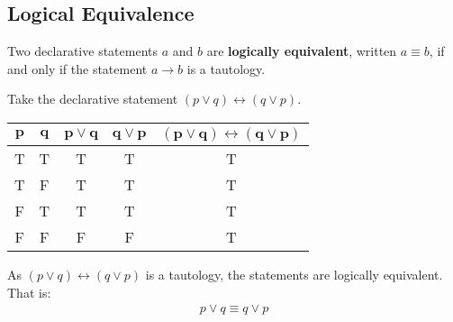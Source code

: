 \documentclass[../notes.tex]{subfiles}
\begin{document}
			\subsection{Logical Equivalence}
				Two declarative statements $a$ and $b$ are \textbf{logically equivalent}, written $a \equiv b$, if and only if the statement $a \rightarrow b$ is a tautology.
				\begin{example}
					Take the declarative statement $(p \lor q) \leftrightarrow (q \lor p)$.
					\begin{center}
						\begin{tabular}{| c c | c | c | c |}
							\hline
							$\mathbf{p}$ & $\mathbf{q}$ & $\mathbf{p \lor q}$ & $\mathbf{q \lor p}$ & $\mathbf{(p \lor q) \leftrightarrow (q \lor p)}$\\
							\hline
							T & T & T & T & T \\
							T & F & T & T & T \\
							F & T & T & T & T \\
							F & F & F & F & T \\
							\hline
						\end{tabular}
					\end{center}
					As $(p \lor q) \leftrightarrow (q \lor p)$ is a tautology, the statements are logically equivalent. That is:
						\begin{align*}
							p \lor q \equiv q \lor p
						\end{align*}
				\end{example}
			\pagebreak
\end{document}
